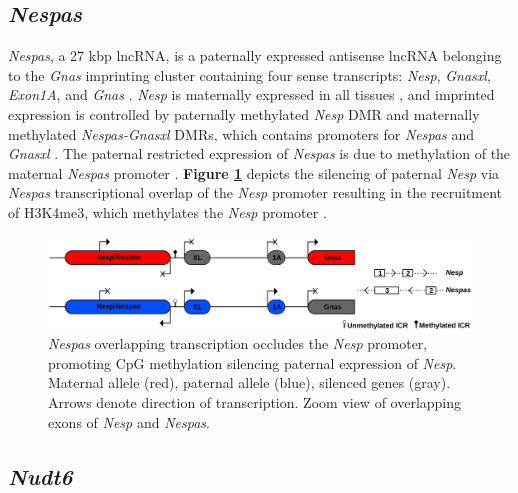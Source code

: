 {\subsection{\textit{Nespas}}

\textit{Nespas}, a 27 kbp lncRNA, is a paternally expressed antisense lncRNA belonging to the \textit{Gnas} imprinting cluster containing four sense transcripts: \textit{Nesp}, \textit{Gnasxl}, \textit{Exon1A}, and \textit{Gnas} \cite{Kelsey1999,Peters1999,Williamson2004,Williamson2002}. \textit{Nesp} is maternally expressed in all tissues \cite{Egrie2001,Peters2006}, and imprinted expression is controlled by paternally methylated \textit{Nesp} DMR and maternally methylated \textit{Nespas-Gnasxl} DMRs, which contains promoters for \textit{Nespas} and \textit{Gnasxl} \cite{Coombes2003,Williamson2006}. The paternal restricted expression of \textit{Nespas} is due to methylation of the maternal \textit{Nespas} promoter \cite{Bliek2009,Holmes2003}. \textbf{Figure \ref{Figure 1-7: }} depicts the silencing of paternal \textit{Nesp} via \textit{Nespas} transcriptional overlap of the \textit{Nesp} promoter resulting in the recruitment of H3K4me3, which methylates the \textit{Nesp} promoter \cite{Ball2013,Tibbit2015,Williamson2011,Williamson2002,Wroe2000}.

\begin{figure}[!ht]
\centering
\includegraphics[scale=0.44]{figures/Nespas2.pdf}
\caption{\emph{Nespas} overlapping transcription occludes the \emph{Nesp} promoter, promoting CpG methylation silencing paternal expression of \emph{Nesp}. Maternal allele (red), paternal allele (blue), silenced genes (gray). Arrows denote direction of transcription. Zoom view of overlapping exons of \emph{Nesp} and \emph{Nespas}.}
\label{Figure 1-7: }
\end{figure}

\subsection{\textit{Nudt6}}

}
